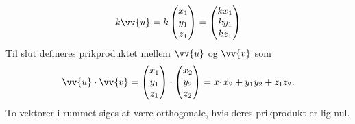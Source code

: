 \begin{defn}
\begin{align*}
		k\vv{u} = k
		\begin{pmatrix}
			x_1 \\ y_1 \\ z_1
		\end{pmatrix}=
		\begin{pmatrix}
			kx_1 \\ ky_1 \\ kz_1
		\end{pmatrix}
	\end{align*}
	Til slut defineres prikproduktet mellem $\vv{u}$ og $\vv{v}$ som 
	\begin{align*}
		\vv{u}\cdot \vv{v} = 
		\begin{pmatrix}
			x_1 \\ y_1 \\ z_1
		\end{pmatrix}
		\cdot
		\begin{pmatrix}
			x_2 \\ y_2 \\ z_2
		\end{pmatrix}
		= 
		x_1x_2+y_1y_2+z_1z_2.
	\end{align*}
	To vektorer i rummet siges at være orthogonale, hvis deres prikprodukt er lig nul. 
\end{defn}

